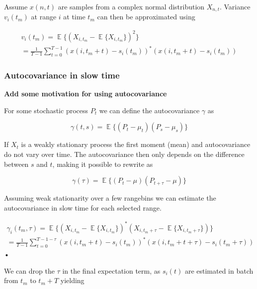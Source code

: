 \documentclass[a4paper, 12pt]{article}
\DeclareMathOperator*{\E}{\mathbb{E}}
\begin{document}
Assume $x(n,t)$ are samples from a complex normal distribution $X_{n,t}$. Variance $v_i(t_m)$ at range $i$ at time $t_m$ can then be approximated using

\begin{equation}
\label{eq:var}
\begin{gathered}
	v_i(t_m) = \E\{ (X_{i,t_m} - \E\{X_{i,t_m}\})^2\} \\
	= \frac{1}{T-1}\sum_{t=0}^{T-1}(x(i, t_m + t) - s_i(t_m))^*(x(i, t_m + t) -  s_i(t_m))
\end{gathered}
\end{equation}

\subsubsection{Autocovariance in slow time}

\textbf{Add some motivation for using autocovariance}

\noindent
For some stochastic process $P_t$ we can define the autocovariance $\gamma$ as

\begin{equation}
	\gamma(t, s) = \E\big\{(P_t - \mu_t)(P_s - \mu_s)\big\}
\end{equation}

If $X_t$ is a weakly stationary process the first moment (mean) and autocovariance do not vary over time.  The autocovariance then only depends on the difference between $s$ and $t$, making it possible to rewrite as

\begin{equation}
	\gamma(\tau) = \E\big\{(P_t - \mu)(P_{t+\tau} - \mu)\big\}
\end{equation}

Assuming weak stationarity over a few rangebins we can estimate the autocovariance in slow time for each selected range. 

\begin{equation}
\begin{gathered}
	\gamma_i(t_m, \tau) = \E\big\{(X_{i,t_m} - \E\{X_{i, t_m}\})^*(X_{i, t_m+\tau} - \E\{X_{i, t_m+\tau}\})\big\}\\
	= \frac{1}{T-1}\sum_{t=0}^{T-1-\tau}(x(i, t_m + t) - s_i(t_m))^*(x(i, t_m + t + \tau) - s_i(t_m + \tau))
\end{gathered}
\end{equation}•

We can drop the $\tau$ in the final expectation term, as $s_i(t)$ are estimated in batch from $t_m$ to  $t_m + T$ yielding
\end{document}
